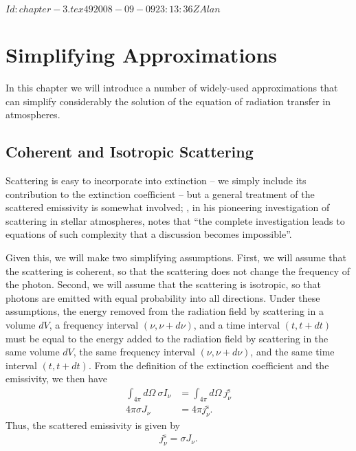 
\svnInfo $Id: chapter-3.tex 49 2008-09-09 23:13:36Z Alan $

\chapter{Simplifying Approximations}

\noindent
In this chapter we will introduce a number of widely-used approximations that can simplify considerably the solution of the equation of radiation transfer in atmospheres.

\section{Coherent and Isotropic Scattering}

Scattering is easy to incorporate into extinction -- we simply include
its contribution to the extinction coefficient -- but a general
treatment of the scattered emissivity is somewhat
involved; \citet[p.\ 5]{Schuster-1905}, in his pioneering
investigation of scattering in stellar atmospheres, notes that ``the
complete investigation leads to equations of such complexity that a
discussion becomes impossible''.

Given this, we  will make two
simplifying assumptions. First, we will assume that the scattering is
coherent, so that the scattering does not change the frequency of the
photon. Second, we will assume that the scattering is isotropic, so that
photons are emitted with equal probability into all directions. Under
these assumptions, the energy removed from the radiation field by
scattering in a volume $dV$, a frequency interval $(\nu,\nu+d\nu)$, and
a time interval $(t,t+dt)$ must be equal to the energy added to the
radiation field by scattering in the same volume $dV$, the same
frequency interval $(\nu,\nu+d\nu)$, and the same time interval
$(t,t+dt)$. From the definition of the extinction coefficient and the
emissivity, we then have
\begin{align}
\int_{4\pi}\!\!\!d\Omega\:
\sigma I_\nu
&=
\int_{4\pi}\!\!\!d\Omega\:
j_\nu^\mathrm{s}\\
4\pi\sigma J_\nu
&=
4\pi j_\nu^\mathrm{s}.
\end{align}
Thus, the scattered emissivity is given by
\begin{align}
j_\nu^\mathrm{s} = \sigma J_\nu.
\end{align}

